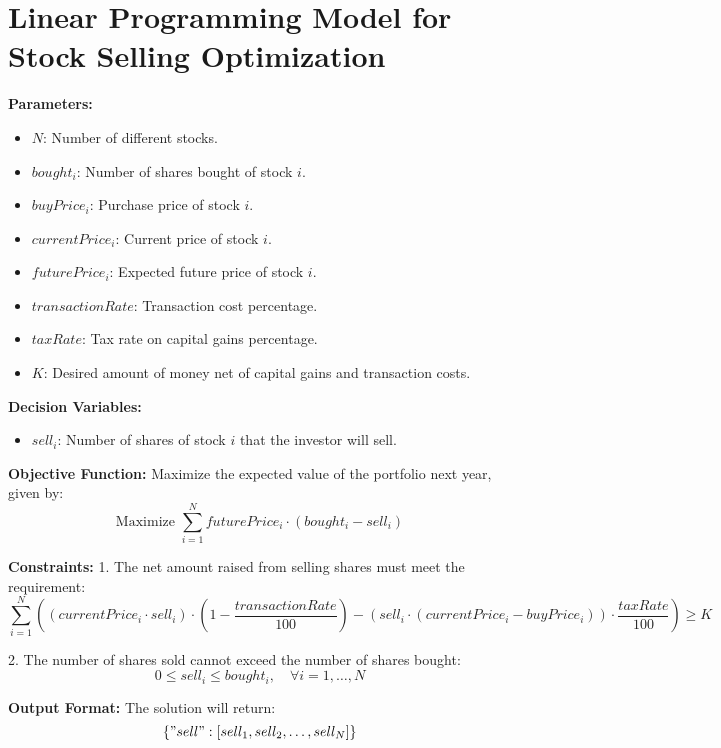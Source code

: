 \documentclass{article}
\begin{document}
\section*{Linear Programming Model for Stock Selling Optimization}

\textbf{Parameters:}
\begin{itemize}
    \item $N$: Number of different stocks.
    \item $bought_i$: Number of shares bought of stock $i$.
    \item $buyPrice_i$: Purchase price of stock $i$.
    \item $currentPrice_i$: Current price of stock $i$.
    \item $futurePrice_i$: Expected future price of stock $i$.
    \item $transactionRate$: Transaction cost percentage.
    \item $taxRate$: Tax rate on capital gains percentage.
    \item $K$: Desired amount of money net of capital gains and transaction costs.
\end{itemize}

\textbf{Decision Variables:}
\begin{itemize}
    \item $sell_i$: Number of shares of stock $i$ that the investor will sell.
\end{itemize}

\textbf{Objective Function:}
Maximize the expected value of the portfolio next year, given by:
\[
\text{Maximize } \sum_{i=1}^{N} futurePrice_i \cdot (bought_i - sell_i) 
\]

\textbf{Constraints:}
1. The net amount raised from selling shares must meet the requirement:
\[
\sum_{i=1}^{N} \left( (currentPrice_i \cdot sell_i) \cdot (1 - \frac{transactionRate}{100}) - (sell_i \cdot (currentPrice_i - buyPrice_i)) \cdot \frac{taxRate}{100} \right) \geq K
\]

2. The number of shares sold cannot exceed the number of shares bought:
\[
0 \leq sell_i \leq bought_i, \quad \forall i = 1, \ldots, N
\]

\textbf{Output Format:}
The solution will return:
\[
\{ "sell": [sell_1, sell_2, \ldots, sell_N] \}
\]
\end{document}
